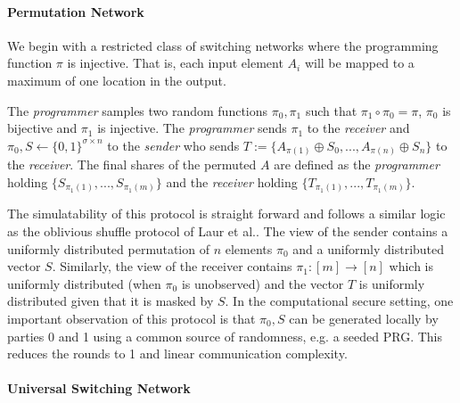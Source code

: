 \paragraph{Permutation Network}

We begin with a restricted class of switching networks where the programming function $\pi$ is injective. That is, each input element $A_i$ will be mapped to a maximum of one location in the output. 

The \emph{programmer} samples two random functions $\pi_0,\pi_1$ such that $\pi_1 \circ \pi_0 = \pi$, $\pi_0$ is bijective and $\pi_1$ is injective. The \emph{programmer} sends   $\pi_1$ to the \emph{receiver} and $\pi_0, S\gets \{0,1\}^{\sigma\times n}$ to the \emph{sender} who sends $T := \{A_{\pi(1)} \oplus S_0, ...,A_{\pi(n)} \oplus S_n \}$ to the \emph{receiver}. The final shares of the permuted $A$ are defined as the \emph{programmer} holding $\{S_{\pi_1(1)}, ..., S_{\pi_1(m)}\}$ and the \emph{receiver} holding $\{T_{\pi_1(1)}, ..., T_{\pi_1(m)}\}$.
\iffullversion

The simulatability of this protocol is straight forward and follows a similar logic as the oblivious shuffle protocol of Laur et al.\cite{LWZ11}. 
The view of the sender contains a uniformly distributed permutation of $n$ elements $\pi_0$ and a uniformly distributed vector $S$. Similarly, the view of the receiver contains $\pi_1: [m]\rightarrow [n]$ which is uniformly distributed (when $\pi_0$ is unobserved) and the vector $T$ is uniformly distributed given that it is masked by $S$. 
\fi
In the computational secure setting, one important observation of this protocol is that $\pi_0,S$ can be generated locally by parties 0 and 1 using a common source of randomness, e.g. a seeded PRG. This reduces the rounds to 1 and linear communication complexity.  

\paragraph{Universal Switching Network}\label{sec:switch}

